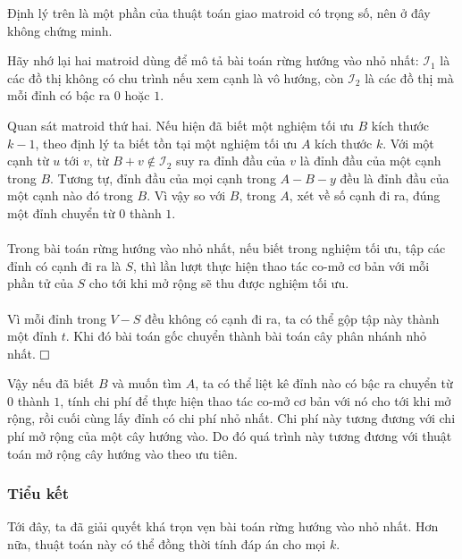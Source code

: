 \documentclass[11pt]{article}
\newcommand{\proofbox}{\ensuremath{\vcenter{\hrule height 0.45pt
  \hbox{\vrule width 0.45pt height 6pt\kern 6pt\vrule width 0.45pt}
  \hrule height 0.45pt}}}
\begin{document}
Định lý trên là một phần của thuật toán giao matroid có trọng số, nên ở đây
không chứng minh.

Hãy nhớ lại hai matroid dùng để mô tả bài toán rừng hướng vào nhỏ nhất:
\(\mathcal{I}_1\) là các đồ thị không có chu trình nếu xem cạnh là vô hướng,
còn \(\mathcal{I}_2\) là các đồ thị mà mỗi đỉnh có bậc ra \(0\) hoặc \(1\).

Quan sát matroid thứ hai. Nếu hiện đã biết một nghiệm tối ưu \(B\) kích thước
\(k-1\), theo định lý ta biết tồn tại một nghiệm tối ưu \(A\) kích thước \(k\).
Với một cạnh từ \(u\) tới \(v\), từ \(B+v\notin\mathcal{I}_2\) suy ra đỉnh đầu
của \(v\) là đỉnh đầu của một cạnh trong \(B\). Tương tự, đỉnh đầu của mọi cạnh
trong \(A-B-y\) đều là đỉnh đầu của một cạnh nào đó trong \(B\). Vì vậy so với
\(B\), trong \(A\), xét về số cạnh đi ra, đúng một đỉnh chuyển từ \(0\) thành
\(1\).

\paragraph{}
Trong bài toán rừng hướng vào nhỏ nhất, nếu biết trong nghiệm tối ưu, tập các
đỉnh có cạnh đi ra là \(S\), thì lần lượt thực hiện thao tác co-mở cơ bản với
mỗi phần tử của \(S\) cho tới khi mở rộng sẽ thu được nghiệm tối ưu.

\paragraph{}
Vì mỗi đỉnh trong \(V-S\) đều không có cạnh đi ra, ta có thể gộp tập này thành
một đỉnh \(t\). Khi đó bài toán gốc chuyển thành bài toán cây phân nhánh nhỏ
nhất. \proofbox

Vậy nếu đã biết \(B\) và muốn tìm \(A\), ta có thể liệt kê đỉnh nào có bậc ra
chuyển từ \(0\) thành \(1\), tính chi phí để thực hiện thao tác co-mở cơ bản với
nó cho tới khi mở rộng, rồi cuối cùng lấy đỉnh có chi phí nhỏ nhất. Chi phí này
tương đương với chi phí mở rộng của một cây hướng vào. Do đó quá trình này
tương đương với thuật toán mở rộng cây hướng vào theo ưu tiên.

\subsubsection{Tiểu kết}

Tới đây, ta đã giải quyết khá trọn vẹn bài toán rừng hướng vào nhỏ nhất. Hơn
nữa, thuật toán này có thể đồng thời tính đáp án cho mọi \(k\).
\end{document}
